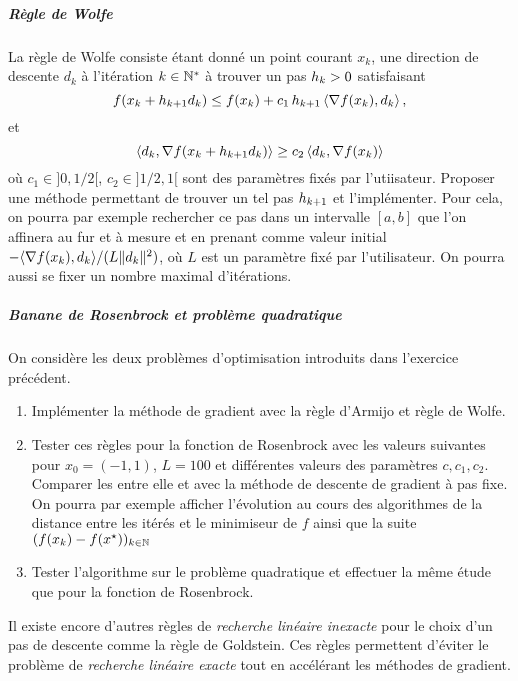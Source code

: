 \documentclass[a4paper,french,12pt]{article}
\begin{document}
\subparagraph{Règle de Wolfe} 
La règle de Wolfe consiste étant donné
un point courant $x_k$, une direction de descente $d_k$ à l'itération
$k \in \mathbb{N}^*$ à trouver un pas $h_k >0$ satisfaisant
\begin{equation*}
  f(x_{k} + h_{k+1} d_{k}) \leq f(x_{k}) 
+ c_1\, h_{k+1}\, \langle \nabla f(x_{k}),d_{k} \rangle \, , 
\end{equation*}
et 
\begin{equation*}
  \left\langle d_k,\nabla f(x_k+h_{k+1} d_k) \right\rangle \geq  c_2    \left\langle d_k,\nabla f(x_k) \right\rangle
\end{equation*}
où $c_1 \in ]0,1/2[$, $c_2 \in ]1/2,1[$ sont des paramètres fixés par
l'utiisateur.  Proposer une méthode permettant de trouver un tel pas
$h_{k+1}$ et l'implémenter. Pour cela, on pourra par exemple
rechercher ce pas dans un intervalle
$[a,b]$ que l'on affinera au fur et à mesure et en prenant comme valeur initial $-\langle \nabla f(x_{k}),d_{k} \rangle/(L \|d_{k}\|^2)$, où
$L$ est un paramètre fixé par l'utilisateur. On pourra aussi se fixer un nombre maximal d'itérations.


\subparagraph{Banane de Rosenbrock et problème quadratique}On considère les deux problèmes d'optimisation introduits dans l'exercice précédent.

\begin{enumerate}
\item Implémenter la méthode de gradient avec la règle d'Armijo et règle de Wolfe.
  
\item Tester ces règles pour la fonction de Rosenbrock avec les valeurs suivantes pour $x_{0} = (-1,1)$, $L=100$ et différentes valeurs des paramètres $c,c_1,c_2$. Comparer les entre elle et avec la méthode de descente de gradient à pas fixe. On pourra par exemple afficher l'évolution au cours des algorithmes de la distance entre les itérés et le minimiseur de $f$ ainsi que la suite $(f(x_k)-f(x^{\star}))_{k \in \mathbb{N}}$
  
\item  Tester l'algorithme sur le problème quadratique et effectuer la même étude que pour la fonction de Rosenbrock.
\end{enumerate}

\begin{remarque}
Il existe encore d'autres règles de \textit{recherche linéaire inexacte} pour le choix d'un pas de descente comme la règle de Goldstein. Ces règles permettent d'éviter le problème de \textit{recherche linéaire exacte} tout en accélérant les méthodes de gradient.
\end{remarque}
%
\end{document}
